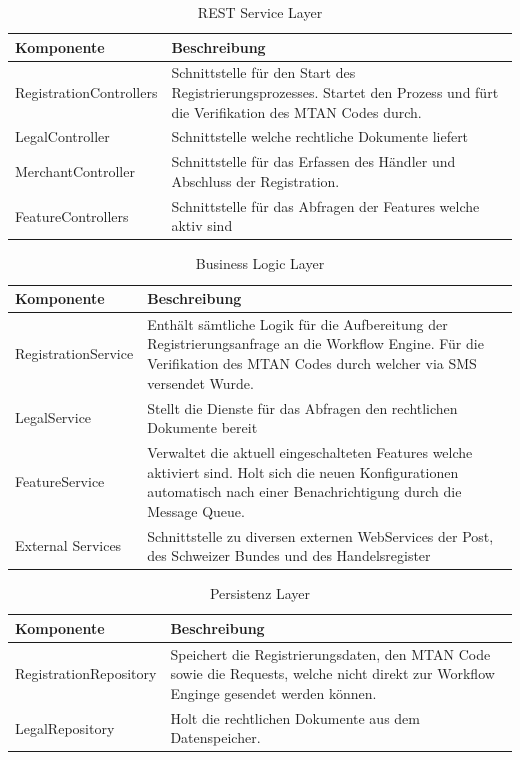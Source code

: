 \begin{table}[H]
	\centering
	\caption{REST Service Layer}
	\begin{tabular}{ | p{4cm} | p{11cm} | }
		\toprule
		{\textbf{Komponente}} & {\textbf{Beschreibung}} \\
		\midrule
		RegistrationControllers &  Schnittstelle für den Start des Registrierungsprozesses. Startet den Prozess und fürt die Verifikation des MTAN Codes durch.\\ \hline
		LegalController &  Schnittstelle welche rechtliche Dokumente liefert \\ \hline
		MerchantController &  Schnittstelle für das Erfassen des Händler und Abschluss der Registration. \\ \hline
		FeatureControllers & Schnittstelle für das Abfragen der Features welche aktiv sind \\
		\bottomrule
	\end{tabular}
\end{table}

\begin{table}[H]
	\centering
	\caption{Business Logic Layer}
	\begin{tabular}{ | p{4cm} | p{11cm} | }
		\toprule
		{\textbf{Komponente}} & {\textbf{Beschreibung}} \\
		\midrule
		RegistrationService &  Enthält sämtliche Logik für die Aufbereitung der Registrierungsanfrage an die Workflow Engine. Für die Verifikation des MTAN Codes durch welcher via SMS versendet Wurde.\\ \hline
		LegalService &  Stellt die Dienste für das Abfragen den rechtlichen Dokumente bereit \\ \hline
		FeatureService &  Verwaltet die aktuell eingeschalteten Features welche aktiviert sind. Holt sich die neuen Konfigurationen automatisch nach einer Benachrichtigung durch die Message Queue. \\ \hline
		External Services & Schnittstelle zu diversen externen WebServices der Post, des Schweizer Bundes und des Handelsregister \\
		\bottomrule
	\end{tabular}
\end{table}

\begin{table}[H]
	\centering
	\caption{Persistenz Layer}
	\begin{tabular}{ | p{4cm} | p{11cm} | }
		\toprule
		{\textbf{Komponente}} & {\textbf{Beschreibung}} \\
		\midrule
		RegistrationRepository &  Speichert die Registrierungsdaten, den MTAN Code sowie die Requests, welche nicht direkt zur Workflow Enginge gesendet werden können. \\ \hline
		LegalRepository &  Holt die rechtlichen Dokumente aus dem Datenspeicher. \\
		\bottomrule
	\end{tabular}
\end{table}

